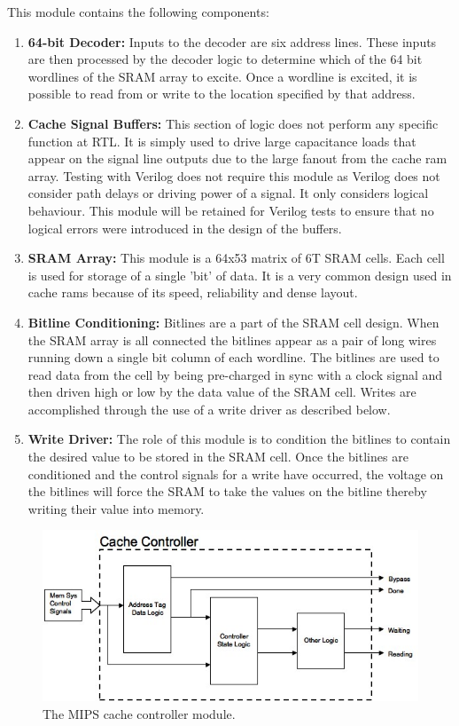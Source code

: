 This module contains the following components:
\begin{enumerate}
\item \textbf{64-bit Decoder: }Inputs to the decoder are six address lines. These inputs are then processed by the decoder logic to determine which of the 64 bit wordlines of the SRAM array to excite. Once a wordline is excited, it is possible to read from or write to the location specified by that address.
\item \textbf{Cache Signal Buffers: }This section of logic does not perform any specific function at RTL. It is simply used to drive large capacitance loads that appear on the signal line outputs due to the large fanout from the cache ram array. Testing with Verilog does not require this module as Verilog does not consider path delays or driving power of a signal. It only considers logical behaviour. This module will be retained for Verilog tests to ensure that no logical errors were introduced in the design of the buffers.
\item \textbf{SRAM Array: }This module is a 64x53 matrix of 6T SRAM cells. Each cell is used for storage of a single 'bit' of data. It is a very common design used in cache rams because of its speed, reliability and dense layout.
\item \textbf{Bitline Conditioning: }Bitlines are a part of the SRAM cell design. When the SRAM array is all connected the bitlines appear as a pair of long wires running down a single bit column of each wordline. The bitlines are used to read data from the cell by being pre-charged in sync with a clock signal and then driven high or low by the data value of the SRAM cell. Writes are accomplished through the use of a write driver as described below.
\item \textbf{Write Driver: }The role of this module is to condition the bitlines to contain the desired value to be stored in the SRAM cell. Once the bitlines are conditioned and the control signals for a write have occurred, the voltage on the bitlines will force the SRAM to take the values on the bitline thereby writing their value into memory.
\end{enumerate}

\begin{figure}
\centering 
\includegraphics[width=\textwidth]{cachecontroller.jpg}
\caption{The MIPS cache controller module.}
\label{cachecontroller}
\end{figure}


